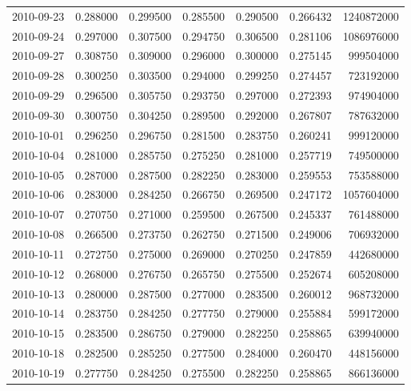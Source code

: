 \begin{tabular}{lrrrrrr}
2010-09-23 &    0.288000 &    0.299500 &    0.285500 &    0.290500 &    0.266432 &  1240872000 \\
2010-09-24 &    0.297000 &    0.307500 &    0.294750 &    0.306500 &    0.281106 &  1086976000 \\
2010-09-27 &    0.308750 &    0.309000 &    0.296000 &    0.300000 &    0.275145 &   999504000 \\
2010-09-28 &    0.300250 &    0.303500 &    0.294000 &    0.299250 &    0.274457 &   723192000 \\
2010-09-29 &    0.296500 &    0.305750 &    0.293750 &    0.297000 &    0.272393 &   974904000 \\
2010-09-30 &    0.300750 &    0.304250 &    0.289500 &    0.292000 &    0.267807 &   787632000 \\
2010-10-01 &    0.296250 &    0.296750 &    0.281500 &    0.283750 &    0.260241 &   999120000 \\
2010-10-04 &    0.281000 &    0.285750 &    0.275250 &    0.281000 &    0.257719 &   749500000 \\
2010-10-05 &    0.287000 &    0.287500 &    0.282250 &    0.283000 &    0.259553 &   753588000 \\
2010-10-06 &    0.283000 &    0.284250 &    0.266750 &    0.269500 &    0.247172 &  1057604000 \\
2010-10-07 &    0.270750 &    0.271000 &    0.259500 &    0.267500 &    0.245337 &   761488000 \\
2010-10-08 &    0.266500 &    0.273750 &    0.262750 &    0.271500 &    0.249006 &   706932000 \\
2010-10-11 &    0.272750 &    0.275000 &    0.269000 &    0.270250 &    0.247859 &   442680000 \\
2010-10-12 &    0.268000 &    0.276750 &    0.265750 &    0.275500 &    0.252674 &   605208000 \\
2010-10-13 &    0.280000 &    0.287500 &    0.277000 &    0.283500 &    0.260012 &   968732000 \\
2010-10-14 &    0.283750 &    0.284250 &    0.277750 &    0.279000 &    0.255884 &   599172000 \\
2010-10-15 &    0.283500 &    0.286750 &    0.279000 &    0.282250 &    0.258865 &   639940000 \\
2010-10-18 &    0.282500 &    0.285250 &    0.277500 &    0.284000 &    0.260470 &   448156000 \\
2010-10-19 &    0.277750 &    0.284250 &    0.275500 &    0.282250 &    0.258865 &   866136000 \\

\end{tabular}

